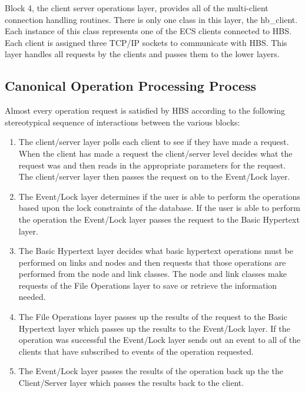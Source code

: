 Block 4, the client server operations layer, provides all of the
multi-client connection handling routines.  There is only one class in this
layer, the hb\_client.  Each instance of this class represents one of the
ECS clients connected to HBS.  Each client is assigned three TCP/IP sockets
to communicate with HBS.  This layer handles all requests by the clients
and passes them to the lower layers.

\subsection{Canonical Operation Processing Process}

Almost every operation request is satisfied by HBS according to the
following stereotypical sequence of interactions between the various
blocks:


\begin{enumerate}
\item The client/server layer polls each client to see if they have made a
  request.  When the client has made a request the client/server level
  decides what the request was and then reads in the appropriate parameters
  for the request.  The client/server layer then passes the request on to the
  Event/Lock layer.

\item The Event/Lock layer determines if the user is able to perform the
  operations based upon the lock constraints of the database.  If the
  user is able to perform the operation the Event/Lock layer passes the
  request to the Basic Hypertext layer.

\item The Basic Hypertext layer decides what basic hypertext operations
  must be performed on links and nodes and then requests that those
  operations are performed from the node and link classes.  The node and link
  classes make requests of the File Operations layer to save or retrieve the
  information needed.

\item The File Operations layer passes up the results of the request to
  the Basic Hypertext layer which passes up the results to the Event/Lock
  layer.  If the operation was successful the Event/Lock layer sends out
  an event to all of the clients that have subscribed to events of the
  operation requested.

\item The Event/Lock layer passes the results of the operation back up
  the the Client/Server layer which passes the results back to the
  client.
\end{enumerate}
 
